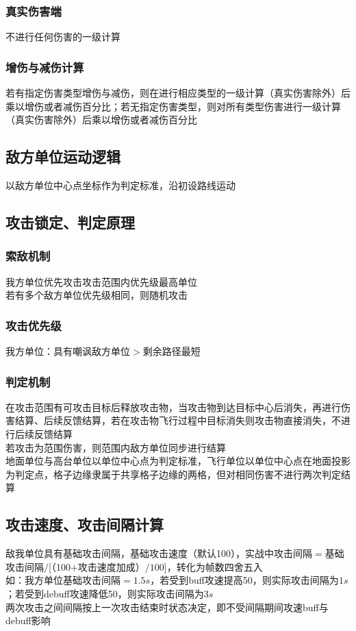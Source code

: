 \documentclass[a4paper, 12pt]{article}
\begin{document}
			\subsubsection{真实伤害端}
				不进行任何伤害的一级计算
			\subsubsection{增伤与减伤计算}
				若有指定伤害类型增伤与减伤，则在进行相应类型的一级计算（真实伤害除外）后乘以增伤或者减伤百分比；若无指定伤害类型，则对所有类型伤害进行一级计算（真实伤害除外）后乘以增伤或者减伤百分比
		\subsection{敌方单位运动逻辑}
			以敌方单位中心点坐标作为判定标准，沿初设路线运动
		\subsection{攻击锁定、判定原理}
			\subsubsection{索敌机制}
				我方单位优先攻击攻击范围内优先级最高单位\\
				\indent 若有多个敌方单位优先级相同，则随机攻击\\
			\subsubsection{攻击优先级}
				我方单位：具有嘲讽敌方单位$>$剩余路径最短\\
			\subsubsection{判定机制}
				在攻击范围有可攻击目标后释放攻击物，当攻击物到达目标中心后消失，再进行伤害结算、后续反馈结算，若在攻击物飞行过程中目标消失则攻击物直接消失，不进行后续反馈结算\\
				\indent 若攻击为范围伤害，则范围内敌方单位同步进行结算\\
				\indent 地面单位与高台单位以单位中心点为判定标准，飞行单位以单位中心点在地面投影为判定点，格子边缘隶属于共享格子边缘的两格，但对相同伤害不进行两次判定结算
		\subsection{攻击速度、攻击间隔计算}
			敌我单位具有基础攻击间隔，基础攻击速度（默认100），实战中攻击间隔$=$基础攻击间隔$/$[（100$+$攻击速度加成）$/100$]，转化为帧数四舍五入\\
			\indent 如：我方单位基础攻击间隔$=1.5s$，若受到buff攻速提高50，则实际攻击间隔为$1s$；若受到debuff攻速降低50，则实际攻击间隔为$3s$\\
			\indent 两次攻击之间间隔按上一次攻击结束时状态决定，即不受间隔期间攻速buff与debuff影响
\end{document}
